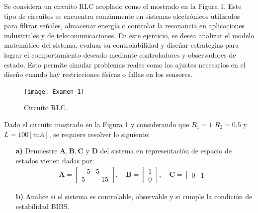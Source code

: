\documentclass[
  11pt,
  letterpaper,
   addpoints,
  ]{exam}
\begin{document}
\vspace{0.5cm}
\noindent
\vspace{.85cm}
\begin{questions}
    \question Se considera un circuito RLC acoplado como el mostrado en la Figura 1. Este tipo de circuitos se encuentra comúnmente en sistemas electrónicos utilizados para filtrar señales, almacenar energía o controlar la resonancia en aplicaciones industriales y de telecomunicaciones. En este ejercicio, se desea analizar el modelo matemático del sistema, evaluar su controlabilidad y diseñar estrategias para lograr el comportamiento deseado mediante controladores y observadores de estado. Esto permite simular problemas reales como los ajustes necesarios en el diseño cuando hay restricciones físicas o fallas en los sensores.

    \begin{figure}[h!]
        \centering
        \texttt{[image: Examen\_1]}
        \caption{Circuito RLC.}
    \end{figure}
    Dado el circuito mostrado en la Figura 1 y considerando que $R_{1}= 1$ $R_{2} = 0.5$ y $L=100[mA]$, se requiere resolver lo siguiente:

    \begin{enumerate}
        \item[\textbf{a)}] Demuestre  \( \mathbf{A}, \mathbf{B}, \mathbf{C} \) y \( \mathbf{D} \) del sistema en representación de espacio de estados vienen dadas por:
        \begin{align}
            \mathbf{A} =
            \begin{bmatrix}
            -5 & 5 \\
            5 & -15
            \end{bmatrix}, \quad
            \mathbf{B} =
            \begin{bmatrix}
            1 \\
            0
            \end{bmatrix}, \quad
            \mathbf{C} =
            \begin{bmatrix}
            0 & 1
            \end{bmatrix}
        \end{align}
        
        \item[\textbf{b)}] Analice si el sistema es controlable, observable y si cumple la condición de estabilidad BIBS.
    

\end{enumerate}
\end{questions}
\end{document}
